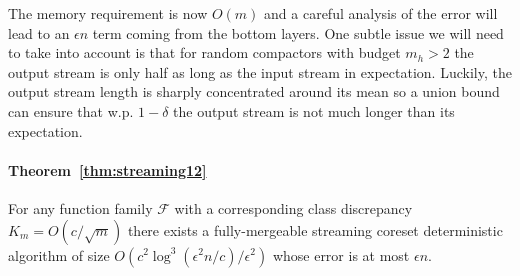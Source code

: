\documentclass[anon,12pt]{colt2019} %
\newcommand{\eps}{\epsilon}
\newcommand{\F}{\mathcal{F}}
\begin{document}
The memory requirement is now $O(m)$ and a careful analysis of the error will lead to an $\eps n$ term coming from the bottom layers. One subtle issue we will need to take into account is that for random compactors with budget $m_h>2$ the output stream is only half as long as the input stream in expectation. Luckily, the output stream length is sharply concentrated around its mean so a union bound can ensure that w.p. $1-\delta$ the output stream is not much longer than its expectation.



\paragraph{Theorem~\ref{thm:streaming12}} 
For any function family $\F$ with a corresponding class discrepancy $K_m = O(c/\sqrt{m})$ there exists a fully-mergeable streaming coreset deterministic algorithm of size $O\left(c^2\log^3(\eps^2 n/c) /\eps^2\right)$ whose error is at most $\eps n$.
\end{document}
